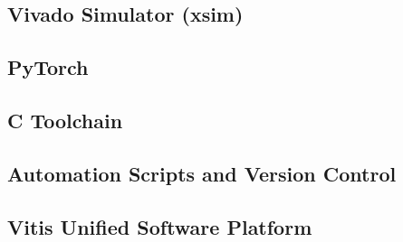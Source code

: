 \subsection{Vivado Simulator (xsim)}
\label{sec:xsim}

\subsection{PyTorch}
\label{sec:pytorch}

\subsection{C Toolchain}
\label{sec:c-toolchain}

\subsection{Automation Scripts and Version Control}
\label{sec:automation}

\subsection{Vitis Unified Software Platform}
\label{sec:vitis}

